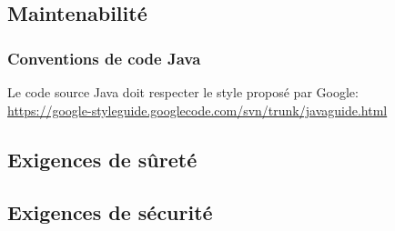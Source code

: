 \subsection{Maintenabilité}
	

\subsubsection{Conventions de code Java}

\begin{requirement}
	Le code source Java doit respecter le style proposé par Google:\\
\url{https://google-styleguide.googlecode.com/svn/trunk/javaguide.html}
\end{requirement}



	\subsection{Exigences de sûreté}

	\subsection{Exigences de sécurité}

